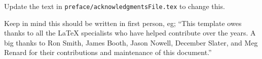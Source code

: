 Update the text in \verb|preface/acknowledgmentsFile.tex| to change this.

Keep in mind this should be written in first person, eg; ``This template owes thanks to all the \LaTeX{} specialists who have helped contribute over the years. A big thanks to Ron Smith, James Booth, Jason Nowell, December Slater, and Meg Renard for their contributions and maintenance of this document.''  